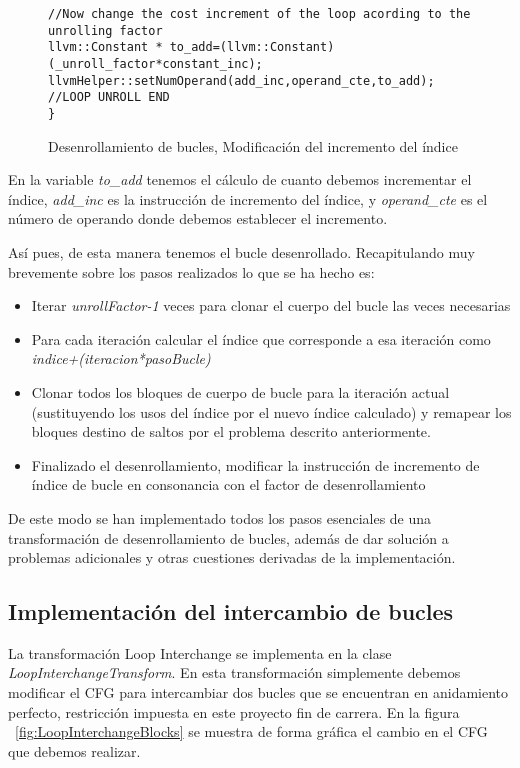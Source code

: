 \begin{figure}[t]
\begin{lstlisting}
//Now change the cost increment of the loop acording to the unrolling factor
llvm::Constant * to_add=(llvm::Constant)(_unroll_factor*constant_inc);
llvmHelper::setNumOperand(add_inc,operand_cte,to_add);
//LOOP UNROLL END
}
\end{lstlisting}
\caption{Desenrollamiento de bucles, Modificación del incremento del índice}
\label{FIG:LoopUnrollIndex}
\end{figure}

En la variable \textit{to\_add} tenemos el cálculo de cuanto debemos incrementar el índice, \textit{add\_inc} es la instrucción de incremento del índice, y \textit{operand\_cte} es el número de operando donde debemos establecer el incremento.

Así pues, de esta manera tenemos el bucle desenrollado. Recapitulando muy brevemente sobre los pasos realizados lo que se ha hecho es:

\begin{itemize}
\item Iterar \textit{unrollFactor-1} veces para clonar el cuerpo del bucle las veces necesarias
\item Para cada iteración calcular el índice que corresponde a esa iteración como \textit{indice+(iteracion*pasoBucle)}
\item Clonar todos los bloques de cuerpo de bucle para la iteración actual (sustituyendo los usos del índice por el nuevo índice calculado) y remapear los bloques destino de saltos por el problema descrito anteriormente.
\item Finalizado el desenrollamiento, modificar la instrucción de incremento de índice de bucle en consonancia con el factor de desenrollamiento
\end{itemize}

De este modo se han implementado todos los pasos esenciales de una transformación de desenrollamiento de bucles, además de dar solución a problemas adicionales y otras cuestiones derivadas de la implementación.

\newpage
\subsection{Implementación del intercambio de bucles}

La transformación Loop Interchange se implementa en la clase \textit{LoopInterchangeTransform}. En esta transformación simplemente debemos modificar el CFG para intercambiar dos bucles que se encuentran en anidamiento perfecto, restricción impuesta en este proyecto fin de carrera. En la figura ~\ref{fig:LoopInterchangeBlocks} se muestra de forma gráfica el cambio en el CFG que debemos realizar.

